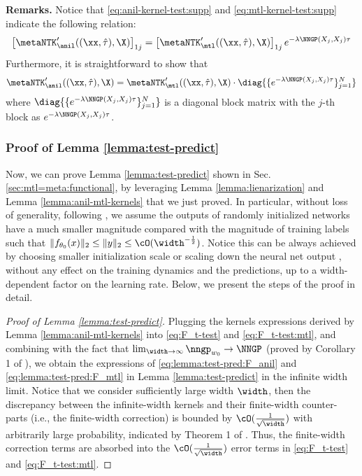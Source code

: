 \documentclass{article}
\begin{document}
\textbf{Remarks.} Notice that \eqref{eq:anil-kernel-test:supp} and \eqref{eq:mtl-kernel-test:supp} indicate the following relation:
    \begin{align*}
        \left[\metaNTK_\anil'((\xx,\hat\tau),\X)\right]_{1j} = \left[\metaNTK_\mtl'((\xx,\hat\tau),\X)\right]_{1j} e^{-\lambda \NNGP(X_j,X_j)\tau}
    \end{align*}
    Furthermore, it is straightforward to show that
    \begin{align}\label{eq:anil-mtl-test-kernel-relation}
        \metaNTK_\anil'((\xx,\hat\tau),\X) = \metaNTK_\mtl'((\xx,\hat\tau),\X) \cdot \diag{\{e^{-\lambda \NNGP(X_j,X_j)\tau}\}_{j=1}^N}
    \end{align}
    where $\diag{\{e^{-\lambda \NNGP(X_j,X_j)\tau}\}_{j=1}^N}$ is a diagonal block matrix with the $j$-th block as $e^{-\lambda \NNGP(X_j,X_j)\tau}$.
\subsubsection{Proof of Lemma \ref{lemma:test-predict}} \label{supp:proof:proof-of-lemma-test-predict}
Now, we can prove Lemma \ref{lemma:test-predict} shown in Sec. \ref{sec:mtl=meta:functional}, by leveraging Lemma \ref{lemma:lienarization} and Lemma \ref{lemma:anil-mtl-kernels} that we just proved. In particular, without loss of generality, following \citet{CNTK}, we assume the outputs of randomly initialized networks have a much smaller magnitude compared with the magnitude of training labels such that $\|f_{\theta_0}(x)\|_2 \leq \|y\|_2 \leq \cO(\width^{-\frac 1 2})$. Notice this can be always achieved by choosing smaller initialization scale or scaling down the neural net output \cite{CNTK}, without any effect on the training dynamics and the predictions, up to a width-dependent factor on the learning rate. Below, we present the steps of the proof in detail.


\begin{proof}[Proof of Lemma \ref{lemma:test-predict}]
Plugging the kernels expressions derived by Lemma \ref{lemma:anil-mtl-kernels} into \eqref{eq:F_t-test} and \eqref{eq:F_t-test:mtl}, and combining with the fact that $\lim_{\width \rightarrow \infty} \nngp_{w_0}\rightarrow \NNGP$ (proved by Corollary 1 of \citet{lee2019wide}), we obtain the expressions of \eqref{eq:lemma:test-pred:F_anil} and \eqref{eq:lemma:test-pred:F_mtl} in Lemma \ref{lemma:test-predict} in the infinite width limit. Notice that we consider sufficiently large width $\width$, then the discrepancy between the infinite-width kernels and their finite-width counter-parts (i.e., the finite-width correction) is bounded by $\cO(\frac{1}{\sqrt{\width}})$ with arbitrarily large probability, indicated by Theorem 1 of \citet{Hanin2020Finite}. Thus, the finite-width correction terms are absorbed into the $\cO(\frac{1}{\sqrt{\width}})$ error terms in \eqref{eq:F_t-test} and \eqref{eq:F_t-test:mtl}.

\end{proof}
\end{document}
